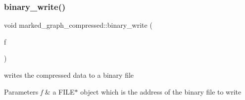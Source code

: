 \mbox{\label{classmarked__graph__compressed_ab9cdb7fc43badd58fb5202f74ffac723}} 
\subsubsection{\texorpdfstring{binary\+\_\+write()}{binary\_write()}\hspace{0.1cm}{\footnotesize\ttfamily [1/2]}}
{\footnotesize\ttfamily void marked\+\_\+graph\+\_\+compressed\+::binary\+\_\+write (\begin{DoxyParamCaption}\item[{F\+I\+LE $\ast$}]{f }\end{DoxyParamCaption})}



writes the compressed data to a binary file 


\begin{DoxyParams}{Parameters}
{\em f} & a {\ttfamily F\+I\+L\+E$\ast$} object which is the address of the binary file to write \\
\hline
\end{DoxyParams}

